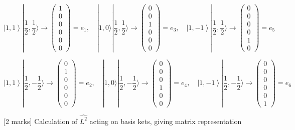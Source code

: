 \documentclass[a4paper,11pt]{article}
\begin{document}
\[
 \left|1, 1 \right> |\frac{1}{2},\frac{1}{2} \rangle \rightarrow \begin{pmatrix} 1\\ 0\\ 0\\ 0\\ 0\\ 0 \end{pmatrix} = e_1, \quad |1, 0 \rangle |\frac{1}{2}, \frac{1}{2} \rangle \rightarrow \begin{pmatrix} 0\\ 0\\ 1\\ 0\\ 0\\ 0 \end{pmatrix} = e_3, \quad \left|1, -1 \right>|\frac{1}{2}, \frac{1}{2} \rangle \rightarrow \begin{pmatrix} 0\\ 0\\ 0\\ 0\\ 1\\ 0 \end{pmatrix} = e_5
\]

\[
 \left|1, 1 \right> |\frac{1}{2},-\frac{1}{2} \rangle \rightarrow \begin{pmatrix} 0\\ 1\\ 0\\ 0\\ 0\\ 0 \end{pmatrix} = e_2, \quad |1, 0 \rangle |\frac{1}{2}, -\frac{1}{2} \rangle \rightarrow \begin{pmatrix} 0\\ 0\\ 0\\ 1\\ 0\\ 0 \end{pmatrix} = e_4, \quad \left|1, -1 \right>|\frac{1}{2}, -\frac{1}{2} \rangle \rightarrow \begin{pmatrix} 0\\ 0\\ 0\\ 0\\ 0\\ 1 \end{pmatrix} = e_6
\]

[2 marks] Calculation of  \( \hat{L^{2}} \) acting on basis kets, giving matrix representation 
\end{document}
